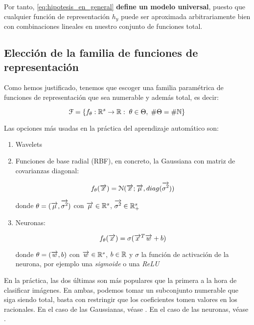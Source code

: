 Por tanto, \eqref{eq:hipotesis_en_general} \textbf{define un modelo universal}, puesto que cualquier función de representación $h_y$ puede ser aproximada arbitrariamente bien con combinaciones lineales en nuestro conjunto de funciones total.

\subsection{Elección de la familia de funciones de representación}

Como hemos justificado, tenemos que escoger una familia paramétrica de funciones de representación que sea numerable y además total, es decir:

\begin{equation}
	\mathcal{F} = \{  f_{\theta}: \mathbb{R}^s \to \mathbb{R}: \; \theta \in \Theta, \; \# \Theta = \# \mathbb{N}  \}
\end{equation}

Las opciones más usadas en la práctica del aprendizaje automático son:

\begin{enumerate}
	\item Wavelets
	\item Funciones de base radial (RBF), en concreto, la Gaussiana con matriz de covarianzas diagonal:

	      \begin{equation}
		      f_\theta(\overrightarrow{x}) = \mathcal{N}(\overrightarrow{x}; \overrightarrow{\mu}, diag(\overrightarrow{\sigma^2}))
	      \end{equation}

	      donde $\theta = (\overrightarrow{\mu}, \overrightarrow{\sigma^2})$ con $\overrightarrow{\mu} \in \mathbb{R}^s$, $\overrightarrow{\sigma^2} \in \mathbb{R}^s_+$

	\item Neuronas:

	      \begin{equation}
		      f_\theta(\overrightarrow{x}) = \sigma(\overrightarrow{x}^T \overrightarrow{w} + b)
	      \end{equation}

	      donde $\theta = (\overrightarrow{w}, b)$ con $\overrightarrow{w} \in \mathbb{R}^s$, $b \in \mathbb{R}$ y $\sigma$ la función de activación de la neurona, por ejemplo una \textit{sigmoide} o una \textit{ReLU}


\end{enumerate}

En la práctica, las dos últimas son más populares que la primera a la hora de clasificar imágenes. En ambas, podemos tomar un subconjunto numerable que siga siendo total, basta con restringir que los coeficientes tomen valores en los racionales. En el caso de las Gaussianas, véase \cite{matematicas:gaussianas_totales}. En el caso de las neuronas, véase \cite{matematicas:neuronas_totales}.

